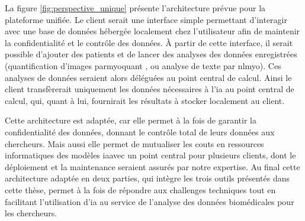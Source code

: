 La figure \ref{fig:perspective_unique} présente l'architecture prévue pour la plateforme unifiée. Le client serait une interface simple permettant d'interagir avec une base de données hébergée localement chez l'utilisateur afin de maintenir la confidentialité et le contrôle des données. À partir de cette interface, il serait possible d'ajouter des patients et de lancer des analyses des données enregistrées (quantification d'images par\gls{myoquant} , ou analyse de texte par \gls{nlmyo}). Ces analyses de données seraient alors déléguées au point central de calcul. Ainsi le client transfèrerait uniquement les données nécessaires à l'\gls{ia} au point central de calcul, qui, quant à lui, fournirait les résultats à stocker localement au client.

Cette architecture est adaptée, car elle permet à la fois de garantir la confidentialité des données, donnant le contrôle total de leurs données aux chercheurs. Mais aussi elle permet de mutualiser les couts en ressources informatiques des modèles  \gls{ia}avec un point central pour plusieurs clients, dont le déploiement et la maintenance seraient assurés par notre expertise. Au final cette architecture adaptée en deux parties, qui intègre les trois outils présentés dans cette thèse, permet à la fois de répondre aux challenges techniques tout en facilitant l'utilisation d'\gls{ia} au service de l'analyse des données biomédicales pour les chercheurs.
